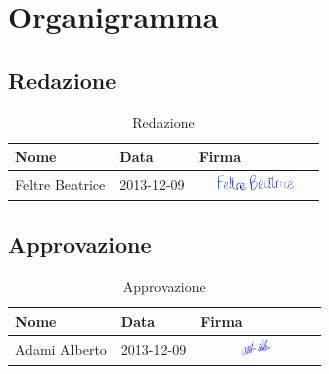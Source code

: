 \newcommand{\tableHeader}{
		\begin{center}
		\begin{tabularx}{0.8\textwidth}{|X|X|X|}
			\hline
			\textbf{Nome} &
			\textbf{Data} &
			\textbf{Firma}\\ \hline
		}

\section{Organigramma}
\label{Organigramma}
\subsection{Redazione}
\begin{table} [!h]
	\tableHeader 
	Feltre Beatrice & 2013-12-09 & \includegraphics[height=0.5cm,width=3cm]{./content/Immagini/firme/bf.png}\\ \hline
	\end{tabularx}\end{center}
	\caption{Redazione}
\end{table}	

\subsection{Approvazione}
\begin{table} [!h]
	\tableHeader 
	Adami Alberto & 2013-12-09 & \includegraphics[height=0.5cm,width=3cm]{./content/Immagini/firme/aa.png}\\ \hline
	\end{tabularx}\end{center}
	\caption{Approvazione}
\end{table}	
